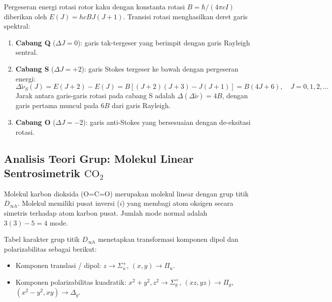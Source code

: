 Pergeseran energi rotasi rotor kaku dengan konstanta rotasi $B = \hbar / (4\pi c I)$ diberikan oleh $E(J) = h c B J(J + 1)$. Transisi rotasi menghasilkan deret garis spektral:
\begin{enumerate}
    \item \textbf{Cabang Q} ($\Delta J = 0$): garis tak-tergeser yang berimpit dengan garis Rayleigh sentral.
    \item \textbf{Cabang S} ($\Delta J = +2$): garis Stokes tergeser ke bawah dengan pergeseran energi:
    \begin{equation}
    \Delta \tilde{\nu}_S(J) = E(J+2) - E(J) = B [(J+2)(J+3) - J(J+1)] = B (4J + 6), \quad J = 0, 1, 2, \dots
    \end{equation}
    Jarak antara garis-garis rotasi pada cabang S adalah $\Delta(\Delta\tilde{\nu}) = 4B$, dengan garis pertama muncul pada $6B$ dari garis Rayleigh.
    \item \textbf{Cabang O} ($\Delta J = -2$): garis anti-Stokes yang bersesuaian dengan de-eksitasi rotasi.
\end{enumerate}

\subsection{Analisis Teori Grup: Molekul Linear Sentrosimetrik $\text{CO}_2$}
Molekul karbon dioksida ($\text{O=C=O}$) merupakan molekul linear dengan grup titik $D_{\infty h}$. Molekul memiliki pusat inversi ($i$) yang membagi atom oksigen secara simetris terhadap atom karbon pusat. Jumlah mode normal adalah $3(3) - 5 = 4$ mode.

Tabel karakter grup titik $D_{\infty h}$ menetapkan transformasi komponen dipol dan polarizabilitas sebagai berikut:
\begin{itemize}
    \item Komponen translasi / dipol: $z \to \Sigma_u^+$, $(x, y) \to \Pi_u$.
    \item Komponen polarizabilitas kuadratik: $x^2 + y^2, z^2 \to \Sigma_g^+$, $(xz, yz) \to \Pi_g$, $(x^2 - y^2, xy) \to \Delta_g$.
\end{itemize}

